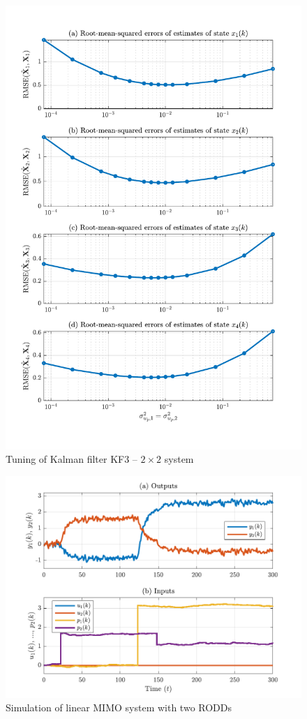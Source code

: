 \begin{figure}[htp]
	\centering
	\includegraphics[width=14cm]{images/rod_obs_sim2_3KF_Q_seed_0.pdf}
	\caption{Tuning of Kalman filter KF3 – $2\times2$ system}
	\label{fig:sim-sys-siso--KF3-tuning}
\end{figure}

\begin{figure}[htp]
	\centering
	\includegraphics[width=15cm]{images/rod_obs_sim2_ioplot.pdf}
	\caption{Simulation of linear MIMO system with two RODDs}
	\label{fig:rod-obs-sim-2-ioplot}
\end{figure}

